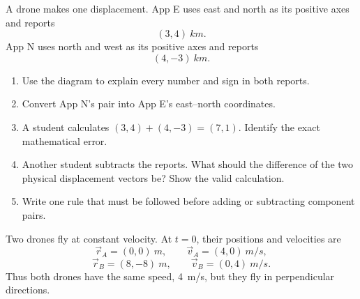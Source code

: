 \documentclass[11pt,a4paper]{article}
\begin{document}



A drone makes one displacement. App E uses east and north as its positive axes and reports
\[
  (3,4)\ \si{km}.
\]
App N uses north and west as its positive axes and reports
\[
  (4,-3)\ \si{km}.
\]


\begin{center}
\end{center}

\begin{enumerate}[label=\alph*)]
  \item Use the diagram to explain every number and sign in both reports.
  \item Convert App N's pair into App E's east--north coordinates.
  \item A student calculates $(3,4)+(4,-3)=(7,1)$. Identify the exact mathematical error.
  \item Another student subtracts the reports. What should the difference of the two physical displacement vectors be? Show the valid calculation.
  \item Write one rule that must be followed before adding or subtracting component pairs.
\end{enumerate}




Two drones fly at constant velocity. At $t=0$, their positions and velocities are
\[
\vec r_A=(0,0)\ \si{m},\qquad \vec v_A=(4,0)\ \si{m/s},
\]
\[
\vec r_B=(8,-8)\ \si{m},\qquad \vec v_B=(0,4)\ \si{m/s}.
\]
Thus both drones have the same speed, \SI{4}{m/s}, but they fly in perpendicular directions.
\end{document}
